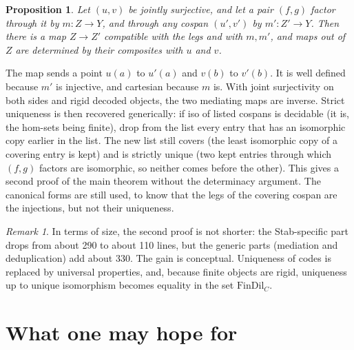 \documentclass[11pt]{article}
\newtheorem{proposition}[theorem]{Proposition}
\theoremstyle{definition}
\theoremstyle{remark}
\newtheorem{remark}[theorem]{Remark}
\begin{document}
\begin{proposition}
Let $(u,v)$ be jointly surjective, and let a pair $(f,g)$ factor through it
by $m:Z\to Y$, and through any cospan $(u',v')$ by $m':Z'\to Y$. Then there
is a map $Z\to Z'$ compatible with the legs and with $m,m'$, and maps out
of $Z$ are determined by their composites with $u$ and $v$.
\end{proposition}

The map sends a point $u(a)$ to $u'(a)$ and $v(b)$ to $v'(b)$. It is well
defined because $m'$ is injective, and cartesian because $m$ is. With joint
surjectivity on both sides and rigid decoded objects, the two mediating
maps are inverse. Strict uniqueness is then recovered generically: if iso
of listed cospans is decidable (it is, the hom-sets being finite), drop
from the list every entry that has an isomorphic copy earlier in the list.
The new list still covers (the least isomorphic copy of a covering entry is
kept) and is strictly unique (two kept entries through which $(f,g)$
factors are isomorphic, so neither comes before the other). This gives a
second proof of the main theorem without the determinacy argument. The
canonical forms are still used, to know that the legs of the covering
cospan are the injections, but not their uniqueness.

\begin{remark}
In terms of size, the second proof is not shorter: the Stab-specific part
drops from about 290 to about 110 lines, but the generic parts (mediation
and deduplication) add about 330. The gain is conceptual. Uniqueness of
codes is replaced by universal properties, and, because finite objects are
rigid, uniqueness up to unique isomorphism becomes equality in the set
$\mathrm{FinDil}_C$.
\end{remark}

\section{What one may hope for}
\end{document}
